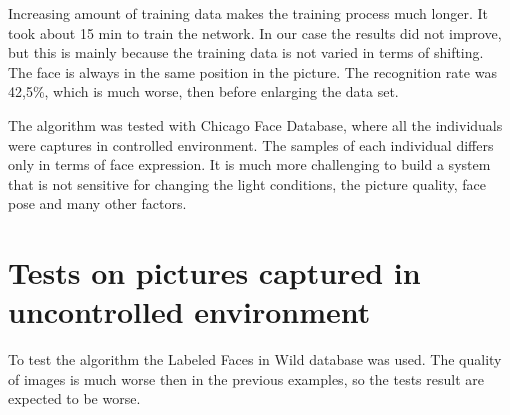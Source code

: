 Increasing amount of training data makes the training process much longer. It took about 15 min to train the network. In our case the results did not improve, but this is mainly because the training data is not varied in terms of shifting. The face is always in the same position in the picture. 
The recognition rate was 42,5\%, which is much worse, then before enlarging the data set. 
 
The algorithm was tested with Chicago Face Database, where all the individuals were captures in controlled environment. 
The samples of each individual differs only in terms of face expression. It is much more challenging to build a system that is not sensitive for changing the light conditions, the picture quality, face pose and many other factors. 

\section{Tests on pictures captured in uncontrolled environment}

To test the algorithm the Labeled Faces in Wild database was used. The quality of images is much worse then in the previous examples, so the tests result are expected to be worse. 


